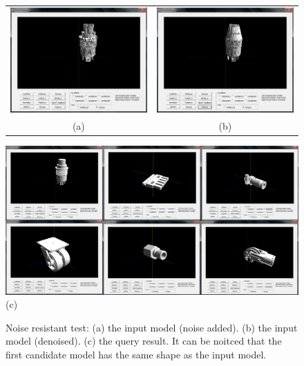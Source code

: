 \begin{figure}
\begin{center}
\begin{tabular}{cc}   %
   \includegraphics[width=0.45\linewidth]{input_noiseinvariant_test_addnoise10} & 
   \includegraphics[width=0.45\linewidth]{input_noiseinvariant_test_denoise10}  \\
   (a) & (b) \\
\end{tabular}
   \includegraphics[width=1\linewidth]{output_noiseinvariant_test10}  \\
   (c)  \\
\caption{Noise resistant test: (a) the input model (noise added). (b) the input model (denoised). (c) the query result. It can be noitced that the first candidate model has the same shape as the input model.} 
  \label{noiseinvarianttest_UI}
\end{center}
\end{figure}

